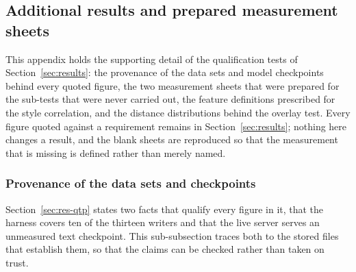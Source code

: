 
\subsection{Additional results and prepared measurement sheets}
\label{sec:app-res}

This appendix holds the supporting detail of the qualification tests of Section~\ref{sec:results}: the provenance of the data sets and model checkpoints behind every quoted figure, the two measurement sheets that were prepared for the sub-tests that were never carried out, the feature definitions prescribed for the style correlation, and the distance distributions behind the overlay test.
Every figure quoted against a requirement remains in Section~\ref{sec:results}; nothing here changes a result, and the blank sheets are reproduced so that the measurement that is missing is defined rather than merely named.

\subsubsection{Provenance of the data sets and checkpoints}
\label{sec:app-prov}

Section~\ref{sec:res-qtp} states two facts that qualify every figure in it, that the harness covers ten of the thirteen writers and that the live server serves an unmeasured text checkpoint.
This sub-subsection traces both to the stored files that establish them, so that the claims can be checked rather than taken on trust.

